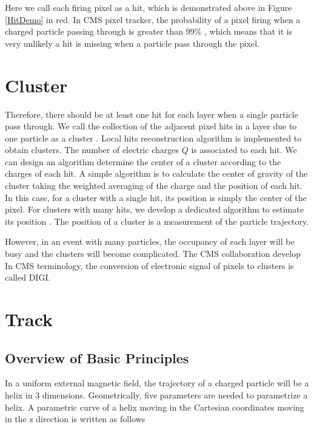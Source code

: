 Here we call each firing pixel as a hit, which is demonstrated above in Figure \ref{HitDemo} in red. In CMS pixel tracker, the probability of a pixel firing when a charged particle passing through is greater than 99\% \cite{CMSTrackComp}, which means that it is very unlikely a hit is missing when a particle pass through the pixel. 



\section{Cluster}


Therefore, there should be at least one hit for each layer when a single particle pass through. We call the collection of the adjacent pixel hits in a layer due to one particle as a cluster \cite{CMSTrackComp}. Local hits reconstruction algorithm is implemented to obtain clusters. The number of electric charges $Q$ is associated to each hit. We can design an algorithm determine the center of a cluster according to the charges of each hit. A simple algorithm is to calculate the center of gravity of the cluster taking the weighted averaging of the charge and the position of each hit. In this case, for a cluster with a single hit, its position is simply the center of the pixel. For clusters with many hits, we develop a dedicated algorithm to estimate its position \cite{CMSTrackComp}. The position of a cluster is a measurement of the particle trajectory. 

However, in an event with many particles, the occupancy of each layer will be busy and the clusters will become complicated. The CMS collaboration develop  In CMS terminology, the conversion of electronic signal of pixels to clusters is called DIGI.


\section{Track}

\subsection{Overview of Basic Principles}

In a uniform external magnetic field, the trajectory of a charged particle will be a helix in 3 dimensions. Geometrically, five parameters are needed to parametrize a helix. A parametric curve of a helix moving in the Cartesian coordinates moving in the z direction is written as follows

